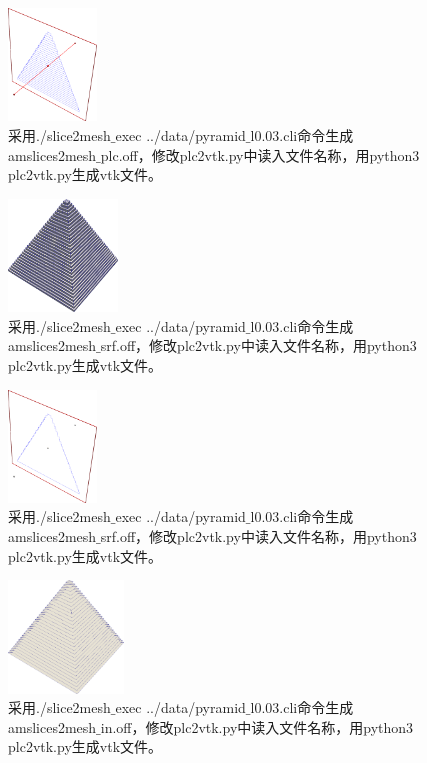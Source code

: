 \begin{figure}[!htbp]
  \centering
  \includegraphics[height=3cm]{fig/1/1.1.7.1:2.png}
  \caption{采用./slice2mesh$\_$exec ../data/pyramid$\_$l0.03.cli命令生成amslices2mesh$\_$plc.off，修改plc2vtk.py中读入文件名称，用python3 plc2vtk.py生成vtk文件。}
  \label{fig:1-7}
\end{figure}

\begin{figure}[!htbp]
  \centering
  \includegraphics[height=3cm]{fig/1/1.1.7.1:3.png}
  \caption{采用./slice2mesh$\_$exec ../data/pyramid$\_$l0.03.cli命令生成amslices2mesh$\_$srf.off，修改plc2vtk.py中读入文件名称，用python3 plc2vtk.py生成vtk文件。}
  \label{fig:1-7}
\end{figure}

\begin{figure}[!htbp]
  \centering
  \includegraphics[height=3cm]{fig/1/1.1.7.1:4.png}
  \caption{采用./slice2mesh$\_$exec ../data/pyramid$\_$l0.03.cli命令生成amslices2mesh$\_$srf.off，修改plc2vtk.py中读入文件名称，用python3 plc2vtk.py生成vtk文件。}
  \label{fig:1-7}
\end{figure}

\begin{figure}[!htbp]
  \centering
  \includegraphics[height=3cm]{fig/1/1.1.7.1:5.png}
  \caption{采用./slice2mesh$\_$exec ../data/pyramid$\_$l0.03.cli命令生成amslices2mesh$\_$in.off，修改plc2vtk.py中读入文件名称，用python3 plc2vtk.py生成vtk文件。}
  \label{fig:1-7}
\end{figure}

